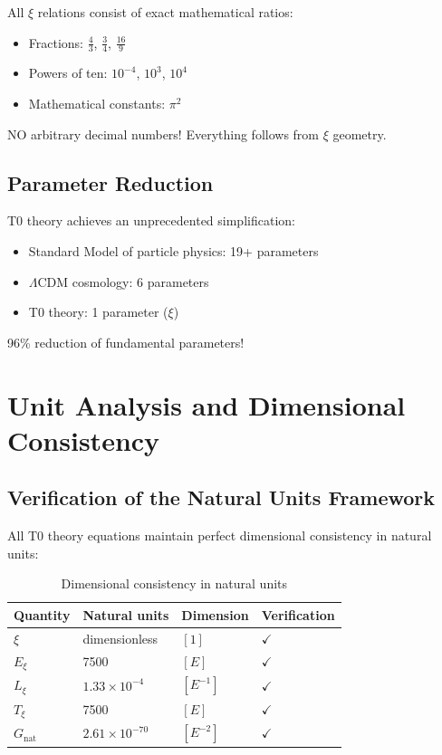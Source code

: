 	\begin{important}
		All $\xi$ relations consist of exact mathematical ratios:
		\begin{itemize}
			\item Fractions: $\frac{4}{3}$, $\frac{3}{4}$, $\frac{16}{9}$
			\item Powers of ten: $10^{-4}$, $10^3$, $10^4$
			\item Mathematical constants: $\pi^2$
		\end{itemize}
		NO arbitrary decimal numbers! Everything follows from $\xi$ geometry.
	\end{important}
	
	\subsection{Parameter Reduction}
	
	\begin{revolutionary}
		T0 theory achieves an unprecedented simplification:
		\begin{itemize}
			\item Standard Model of particle physics: 19+ parameters
			\item $\Lambda$CDM cosmology: 6 parameters
			\item T0 theory: 1 parameter ($\xi$)
		\end{itemize}
		96\% reduction of fundamental parameters!
	\end{revolutionary}
	
	\section{Unit Analysis and Dimensional Consistency}
	
	\subsection{Verification of the Natural Units Framework}
	
	All T0 theory equations maintain perfect dimensional consistency in natural units:
	
	\begin{table}[h]
		\centering
		\begin{tabular}{l l l l}
			\toprule
			Quantity & Natural units & Dimension & Verification \\
			\midrule
			$\xi$ & dimensionless & $[1]$ & $\checkmark$ \\
			$E_\xi$ & 7500 & $[E]$ & $\checkmark$ \\
			$L_\xi$ & $1.33 \times 10^{-4}$ & $[E^{-1}]$ & $\checkmark$ \\
			$T_\xi$ & 7500 & $[E]$ & $\checkmark$ \\
			$G_{\text{nat}}$ & $2.61 \times 10^{-70}$ & $[E^{-2}]$ & $\checkmark$ \\
			\bottomrule
		\end{tabular}
		\caption{Dimensional consistency in natural units}
	\end{table}
	
